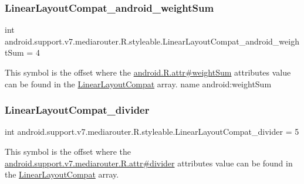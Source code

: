 \subsubsection{\texorpdfstring{Linear\+Layout\+Compat\+\_\+android\+\_\+weight\+Sum}{LinearLayoutCompat\_android\_weightSum}}
{\footnotesize\ttfamily int android.\+support.\+v7.\+mediarouter.\+R.\+styleable.\+Linear\+Layout\+Compat\+\_\+android\+\_\+weight\+Sum = 4\hspace{0.3cm}{\ttfamily [static]}}

This symbol is the offset where the \hyperlink{}{android.\+R.\+attr\#weight\+Sum} attribute\textquotesingle{}s value can be found in the \hyperlink{classandroid_1_1support_1_1v7_1_1mediarouter_1_1R_1_1styleable_a47eee9f8c488407b3ea7145bb65c01b9}{Linear\+Layout\+Compat} array.  name android\+:weight\+Sum \mbox{\label{classandroid_1_1support_1_1v7_1_1mediarouter_1_1R_1_1styleable_a971e3c277de0c3db5814dd8f86ca0eb6}} 
\subsubsection{\texorpdfstring{Linear\+Layout\+Compat\+\_\+divider}{LinearLayoutCompat\_divider}}
{\footnotesize\ttfamily int android.\+support.\+v7.\+mediarouter.\+R.\+styleable.\+Linear\+Layout\+Compat\+\_\+divider = 5\hspace{0.3cm}{\ttfamily [static]}}

This symbol is the offset where the \hyperlink{classandroid_1_1support_1_1v7_1_1mediarouter_1_1R_1_1attr_a8be8d169a154b716f3840650590a48f2}{android.\+support.\+v7.\+mediarouter.\+R.\+attr\#divider} attribute\textquotesingle{}s value can be found in the \hyperlink{classandroid_1_1support_1_1v7_1_1mediarouter_1_1R_1_1styleable_a47eee9f8c488407b3ea7145bb65c01b9}{Linear\+Layout\+Compat} array.

